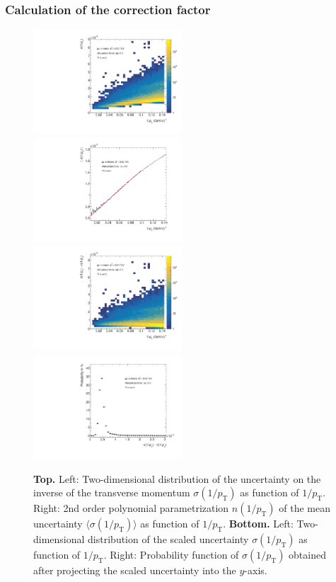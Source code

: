 \documentclass[12pt,a4paper]{report}
\begin{document}
\subsubsection{Calculation of the correction factor}
\begin{figure}[tb!]
\centering
\includegraphics[width=0.495\textwidth]{Plots/reso2dim.pdf}  
\includegraphics[width=0.495\textwidth]{Plots/fitfunc.pdf}  
\includegraphics[width=0.495\textwidth]{Plots/scaledcov.pdf}  
\includegraphics[width=0.495\textwidth]{Plots/probabilitydist.pdf}  
\caption{\textbf{Top.} Left: Two-dimensional distribution of the uncertainty on the inverse of the transverse momentum $\sigma(1/p_{\mathrm{T}})$ as function of $1/p_{\mathrm{T}}$. Right: 2nd order polynomial parametrization $n(1/p_{\mathrm{T}})$ of the mean uncertainty $\langle\sigma(1/p_\text{T})\rangle$ as function of $1/p_{\mathrm{T}}$. \textbf{Bottom.} Left: Two-dimensional distribution of the scaled uncertainty $\sigma(1/p_{\mathrm{T}})$ as function of $1/p_{\mathrm{T}}$. Right: Probability function of $\sigma(1/p_\text{T})$ obtained after projecting the scaled uncertainty into the $y$-axis.}
\label{4plots}
\end{figure}
\end{document}
